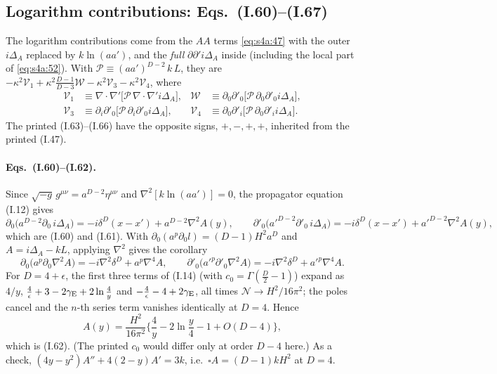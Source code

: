 \documentclass[aps,prd,onecolumn,10pt,nofootinbib,floatfix]{revtex4-2}
\newcommand{\eqI}[1]{(I.#1)}
\begin{document}
\subsection{Logarithm contributions: Eqs.~(I.60)--(I.67)}
\label{sec:s4a:log}

The logarithm contributions come from the $AA$ terms \eqref{eq:s4a:47} with the outer $i\Delta_A$
replaced by $k\ln(aa')$, and the \emph{full} $\partial\partial'i\Delta_A$ inside (including the local part
of \eqref{eq:s4a:52}). With $\mathcal P\equiv(aa')^{D-2}\,k\,L$, they are
$-\kappa^2\mathcal V_1+\kappa^2\frac{D-1}{D-3}\mathcal W-\kappa^2\mathcal V_3-\kappa^2\mathcal V_4$, where
\begin{equation}
\begin{aligned}
\mathcal V_1&\equiv\nabla\!\cdot\!\nabla'\big[\mathcal P\,\nabla\!\cdot\!\nabla' i\Delta_A\big],&
\mathcal W&\equiv\partial_0\partial'_0\big[\mathcal P\,\partial_0\partial'_0 i\Delta_A\big],\\
\mathcal V_3&\equiv\partial_i\partial'_0\big[\mathcal P\,\partial_i\partial'_0 i\Delta_A\big],&
\mathcal V_4&\equiv\partial_0\partial'_i\big[\mathcal P\,\partial_0\partial'_i i\Delta_A\big].
\end{aligned}
\label{eq:s4a:logterms}
\end{equation}
The printed \eqI{63}--\eqI{66} have the opposite signs, $+,-,+,+$, inherited from the printed \eqI{47}.

\paragraph*{Eqs.~(I.60)--(I.62).}
Since $\sqrt{-g}\,g^{\mu\nu}=a^{D-2}\eta^{\mu\nu}$ and $\nabla^2[k\ln(aa')]=0$, the propagator equation \eqI{12}
gives
\begin{equation}
\partial_0\big(a^{D-2}\partial_0\,i\Delta_A\big)=-i\delta^D(x-x')+a^{D-2}\nabla^2A(y),
\qquad
\partial'_0\big(a'^{D-2}\partial'_0\,i\Delta_A\big)=-i\delta^D(x-x')+a'^{D-2}\nabla^2A(y),
\label{eq:s4a:60}
\end{equation}
which are \eqI{60} and \eqI{61}. With $\partial_0(a^p\partial_0l)=(D-1)H^2a^D$ and $A=i\Delta_A-kL$, applying
$\nabla^2$ gives the corollary
\begin{equation}
\partial_0\big(a^p\partial_0\nabla^2A\big)=-i\nabla^2\delta^D+a^p\nabla^4A,
\qquad
\partial'_0\big(a'^p\partial'_0\nabla^2A\big)=-i\nabla^2\delta^D+a'^p\nabla^4A .
\label{eq:s4a:corol}
\end{equation}
For $D=4+\epsilon$, the first three terms of \eqI{14} (with $c_0=\Gamma(\frac D2-1)$) expand as
$4/y$, $\frac4\epsilon+3-2\gamma_{\rm E}+2\ln\frac4y$ and $-\frac4\epsilon-4+2\gamma_{\rm E}$, all times
$\mathcal N\to H^2/16\pi^2$; the poles cancel and the $n$-th series term vanishes identically at $D=4$.
Hence
\begin{equation}
A(y)=\frac{H^2}{16\pi^2}\Big\{\frac4y-2\ln\frac y4-1+O(D-4)\Big\},
\label{eq:s4a:62}
\end{equation}
which is \eqI{62}. (The printed $c_0$ would differ only at order $D-4$ here.) As a check,
$(4y-y^2)A''+4(2-y)A'=3k$, i.e.\ $\square A=(D-1)kH^2$ at $D=4$.
\end{document}
